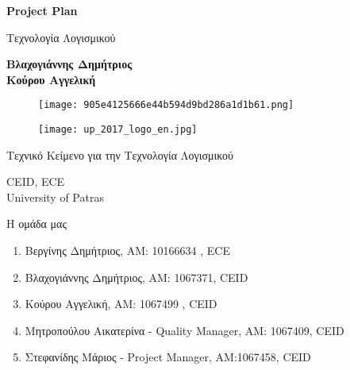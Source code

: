 \documentclass{article}
\begin{document}

\begin{titlepage}
   \begin{center}
       \vspace*{1cm}

       \textbf{\huge Project Plan}

       \vspace{0.5cm}
        Τεχνολογία Λογισμικού
            
       \vspace{1cm}

       \textbf{Βλαχογιάννης Δημήτριος\\ Κούρου Αγγελική}
       
       
       \begin{figure}[!htb]
        \centering
        \texttt{[image: 905e4125666e44b594d9bd286a1d1b61.png]}
        \end{figure}
        
        \vspace{0.5cm}
        
        \begin{figure}[!htb]
        \centering
        \texttt{[image: up\_2017\_logo\_en.jpg]}
        \end{figure}


       \vfill
            
       Τεχνικό Κείμενο για την Τεχνολογία Λογισμικού\\
            
       \vspace{0.5cm}
            
       CEID, ECE\\
       University of Patras\\
            
   \end{center}
\end{titlepage}



\noindent Η ομάδα μας

\begin{enumerate}
  \item Βεργίνης Δημήτριος, ΑΜ: 10166634 , ECE
  \item Βλαχογιάννης Δημήτριος, ΑΜ: 1067371, CEID
  \item Κούρου Αγγελική, ΑΜ: 1067499 , CEID
  \item Μητροπούλου Αικατερίνα - Quality Manager, ΑΜ: 1067409, CEID
  \item Στεφανίδης Μάριος - Project Manager, ΑΜ:1067458, CEID
\end{enumerate}
\end{document}
